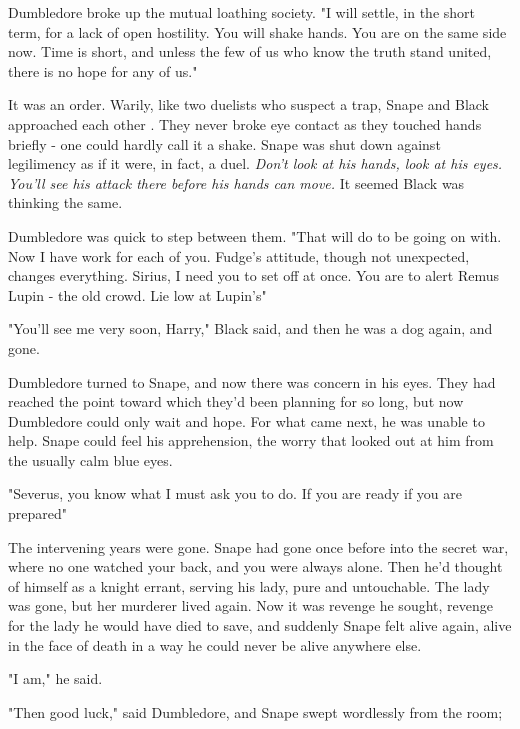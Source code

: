 Dumbledore broke up the mutual loathing society. "I will settle, in the short term, for a lack of open hostility. You will shake hands. You are on the same side now. Time is short, and unless the few of us who know the truth stand united, there is no hope for any of us."

It was an order. Warily, like two duelists who suspect a trap, Snape and Black approached each other . They never broke eye contact as they touched hands briefly - one could hardly call it a shake. Snape was shut down against legilimency as if it were, in fact, a duel. \emph{Don't look at his hands, look at his eyes. You'll see his attack there before his hands can move.} It seemed Black was thinking the same.

Dumbledore was quick to step between them. "That will do to be going on with. Now I have work for each of you. Fudge's attitude, though not unexpected, changes everything. Sirius, I need you to set off at once. You are to alert Remus Lupin{\el} - the old crowd. Lie low at Lupin's{\el}"

"You'll see me very soon, Harry," Black said, and then he was a dog again, and gone.

Dumbledore turned to Snape, and now there was concern in his eyes. They had reached the point toward which they'd been planning for so long, but now Dumbledore could only wait and hope. For what came next, he was unable to help. Snape could feel his apprehension, the worry that looked out at him from the usually calm blue eyes.

"Severus, you know what I must ask you to do. If you are ready{\el} if you are prepared{\el}"

The intervening years were gone. Snape had gone once before into the secret war, where no one watched your back, and you were always alone. Then he'd thought of himself as a knight errant, serving his lady, pure and untouchable. The lady was gone, but her murderer lived again. Now it was revenge he sought, revenge for the lady he would have died to save, and suddenly Snape felt alive again, alive in the face of death in a way he could never be alive anywhere else.

"I am," he said.

"Then good luck," said Dumbledore, and Snape swept wordlessly from the room;


